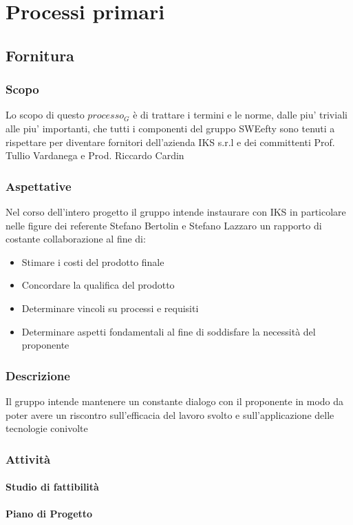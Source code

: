 \section{Processi primari}

\subsection{Fornitura}
	
	\subsubsection{Scopo}
		Lo scopo di questo $processo_G$ è di trattare i termini e le norme, dalle piu' triviali alle piu' importanti, che tutti i componenti del gruppo SWEefty sono tenuti a rispettare per diventare fornitori dell'azienda IKS s.r.l e dei committenti Prof. Tullio Vardanega e Prod. Riccardo Cardin
	\subsubsection{Aspettative}
	Nel corso dell'intero progetto il gruppo intende instaurare con IKS in particolare nelle figure dei referente Stefano Bertolin e Stefano Lazzaro un rapporto di costante collaborazione al fine di:
    \begin{itemize}
	\item Stimare i costi del prodotto finale
	\item Concordare la qualifica del prodotto 
	\item Determinare vincoli su processi e requisiti
	\item Determinare aspetti fondamentali al fine di soddisfare la necessità del proponente
	\end{itemize}
	\subsubsection{Descrizione}
	Il gruppo intende mantenere un constante dialogo con il proponente in modo da poter avere un riscontro sull'efficacia del lavoro svolto e sull'applicazione delle tecnologie conivolte
	\subsubsection{Attività}
		\paragraph{Studio di fattibilità}
		\paragraph{Piano di Progetto}
